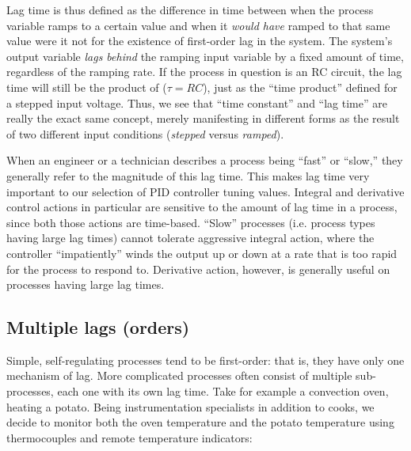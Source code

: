 Lag time is thus defined as the difference in time between when the process variable ramps to a certain value and when it \textit{would have} ramped to that same value were it not for the existence of first-order lag in the system.  The system's output variable \textit{lags behind} the ramping input variable by a fixed amount of time, regardless of the ramping rate.  If the process in question is an RC circuit, the lag time will still be the product of ($\tau = RC$), just as the ``time product'' defined for a stepped input voltage.  Thus, we see that ``time constant'' and ``lag time'' are really the exact same concept, merely manifesting in different forms as the result of two different input conditions (\textit{stepped} versus \textit{ramped}). 

\vskip 10pt

When an engineer or a technician describes a process being ``fast'' or ``slow,'' they generally refer to the magnitude of this lag time.  This makes lag time very important to our selection of PID controller tuning values.  Integral and derivative control actions in particular are sensitive to the amount of lag time in a process, since both those actions are time-based.  ``Slow'' processes (i.e. process types having large lag times) cannot tolerate aggressive integral action, where the controller ``impatiently'' winds the output up or down at a rate that is too rapid for the process to respond to.  Derivative action, however, is generally useful on processes having large lag times.







\filbreak
\subsection{Multiple lags (orders)}

Simple, self-regulating processes tend to be first-order: that is, they have only one mechanism of lag.  More complicated processes often consist of multiple sub-processes, each one with its own lag time.  Take for example a convection oven, heating a potato.  Being instrumentation specialists in addition to cooks, we decide to monitor both the oven temperature and the potato temperature using thermocouples and remote temperature indicators:

